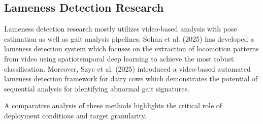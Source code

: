 \begin{table}[H]
\centering
\caption{Summary of Body Condition Scoring Papers}
\label{tab:bcs_papers}
\end{table}

\subsection{Lameness Detection Research}

Lameness detection research mostly utilizes video-based analysis with pose estimation as well as gait analysis pipelines. Sohan et al. (2025) \cite{sohan2025s415} has developed a lameness detection system which focuses on the extraction of locomotion patterns from video using spatiotemporal deep learning to achieve the most robust classification. Moreover, Szyc et al. (2025) \cite{szyc2025s251} introduced a video-based automated lameness detection framework for dairy cows which demonstrates the potential of sequential analysis for identifying abnormal gait signatures. 

A comparative analysis of these methods highlights the critical role of deployment conditions and target granularity.

\begin{table}[H]
\centering
\caption{Summary of Lameness Detection Papers}
\label{tab:lameness_papers}
\end{table}

